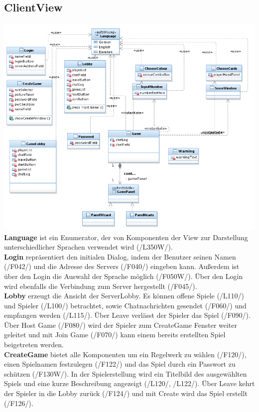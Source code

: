 \documentclass{article}
\begin{document}
\subsection{ClientView}
\includegraphics[width=\textwidth]{ClientView}
\textbf{Language} ist ein Enumerator, der von Komponenten der View zur Darstellung unterschiedlicher Sprachen verwendet wird (/L350W/). \\
			\textbf{Login} repräsentiert den initialen Dialog, indem der Benutzer seinen Namen (/F042/) und die Adresse des Servers (/F040/) eingeben kann. Außerdem ist über den Login die Auswahl der Sprache möglich (/F050W/). Über den Login wird ebenfalls die Verbindung zum Server hergestellt (/F045/).\\
			\textbf{Lobby} erzeugt die Ansicht der ServerLobby. Es können offene Spiele (/L110/) und Spieler (/L100/) betrachtet, sowie Chatnachrichten gesendet (/F060/) und empfangen werden (/L115/). Über Leave verlässt der Spieler das Spiel (/F090/). Über Host Game (/F080/) wird der Spieler zum CreateGame Fenster weiter geleitet und mit Join Game (/F070/) kann einem bereits erstellten Spiel beigetreten werden. \\
			\textbf{CreateGame} bietet alle Komponenten um ein Regelwerk zu wählen (/F120/), einen Spielnamen festzulegen (/F122/) und das Spiel durch ein Passwort zu schützen (/F130W/). In der Spielerstellung wird ein Titelbild des ausgewählten Spiels und eine kurze Beschreibung angezeigt (/L120/, /L122/). Über Leave kehrt der Spieler in die Lobby zurück (/F124/) und mit Create wird das Spiel erstellt (/F126/).\\
\end{document}
